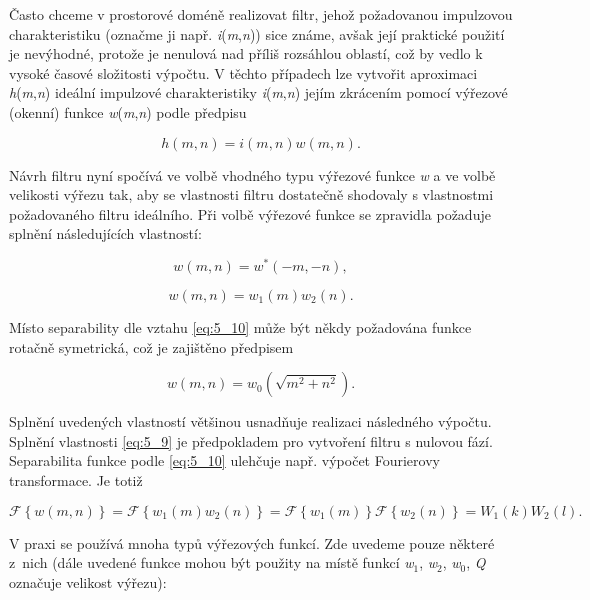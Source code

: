 Často chceme v prostorové doméně realizovat filtr, jehož požadovanou impulzovou charakteristiku (označme ji např. \textit{i}(\textit{m},\textit{n})) sice známe, avšak její praktické použití je nevýhodné, protože je nenulová nad příliš rozsáhlou oblastí, což by vedlo k vysoké časové složitosti výpočtu. V těchto případech lze vytvořit aproximaci \textit{h}(\textit{m},\textit{n}) ideální impulzové charakteristiky \textit{i}(\textit{m},\textit{n}) jejím zkrácením pomocí výřezové (okenní) funkce \textit{w}(\textit{m},\textit{n}) podle předpisu

\begin{equation} \label{eq:5_8}
    h(m, n) = i(m, n) w(m, n).
\end{equation}

Návrh filtru nyní spočívá ve volbě vhodného typu výřezové funkce \textit{w} a ve volbě velikosti výřezu tak, aby se vlastnosti filtru dostatečně shodovaly s vlastnostmi požadovaného filtru ideálního. Při volbě výřezové funkce se zpravidla požaduje splnění následujících vlastností:

\begin{equation} \label{eq:5_9}
    w(m, n) = w^*(-m, -n),
\end{equation}

\begin{equation} \label{eq:5_10}
    w(m, n) = w_1(m) w_2(n).
\end{equation}

Místo separability dle vztahu \eqref{eq:5_10} může být někdy požadována funkce rotačně symetrická, což je zajištěno předpisem

\begin{equation} \label{eq:5_11}
    w(m, n) = w_0\left( \sqrt{m^2 + n^2} \right).
\end{equation}

Splnění uvedených vlastností většinou usnadňuje realizaci následného výpočtu. Splnění vlastnosti \eqref{eq:5_9} je předpokladem pro vytvoření filtru s nulovou fází. Separabilita funkce podle \eqref{eq:5_10} ulehčuje např. výpočet Fourierovy transformace. Je totiž

\begin{equation} \label{eq:5_12}
    \mathscr{F} \left\{ w(m, n) \right\} = \mathscr{F} \left\{ w_1(m)w_2(n) \right\} = \mathscr{F} \left\{ w_1(m) \right\} \mathscr{F} \left\{w_2(n) \right\} = W_1(k) W_2(l).
\end{equation}

V praxi se používá mnoha typů výřezových funkcí. Zde uvedeme pouze některé z~nich (dále uvedené funkce mohou být použity na místě funkcí \textit{w}$_1$, \textit{w}$_2$, \textit{w}$_0$, \textit{Q} označuje velikost výřezu):

